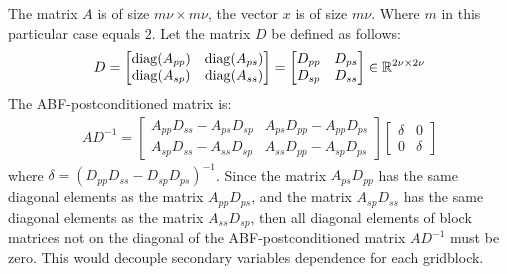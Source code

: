 The matrix $A$ is of size $m\nu\times m\nu$, the vector $x$ is of size $m\nu$. Where $m$ in this particular case equals $2$.
Let the matrix $D$ be defined as follows:
\begin{align}
	D=
\begin{bmatrix}
	\operatorname{diag}(A_{pp}) & \operatorname{diag}(A_{ps})\\
	\operatorname{diag}(A_{sp}) & \operatorname{diag}(A_{ss})
\end{bmatrix} =
\begin{bmatrix}
	D_{pp} & D_{ps}\\
	D_{sp} & D_{ss}
\end{bmatrix}
\in \mathbb{R}^{2\nu\times2\nu}
\end{align}
The ABF-postconditioned matrix is:
\begin{align}
	AD^{-1}=
\begin{bmatrix}
	A_{pp}D_{ss}-A_{ps}D_{sp} & A_{ps}D_{pp}-A_{pp}D_{ps}\\
	A_{sp}D_{ss}-A_{ss}D_{sp} & A_{ss}D_{pp}-A_{sp}D_{ps}
\end{bmatrix}
\begin{bmatrix}
	\delta & 0\\
	0 & \delta
\end{bmatrix}
\end{align}
where $\delta = (D_{pp}D_{ss}-D_{sp}D_{ps})^{-1}$. 
Since the matrix $A_{ps}D_{pp}$ has the same diagonal elements as the matrix $A_{pp}D_{ps}$,
and the matrix $A_{sp}D_{ss}$ has the same diagonal elements as the matrix $A_{ss}D_{sp}$, then
all diagonal elements of block matrices not on the diagonal of the ABF-postconditioned matrix $AD^{-1}$
must be zero. This would decouple secondary variables dependence for each gridblock.
